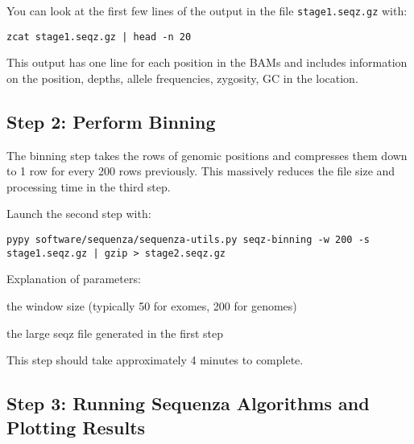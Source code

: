 \begin{information}
You can look at the first few lines of the output in the file \texttt{stage1.seqz.gz} with:
 
\begin{lstlisting}
zcat stage1.seqz.gz | head -n 20
\end{lstlisting}
\end{information}

This output has one line for each position in the BAMs and includes information on the position, depths, allele frequencies, zygosity, GC in the location. 


\subsection{Step 2: Perform Binning}

The binning step takes the rows of genomic positions and compresses them down to 1 row for every 200 rows previously. This massively reduces the file size and processing time in the third step.\\

\begin{steps}
Launch the second step with:
\begin{lstlisting}
pypy software/sequenza/sequenza-utils.py seqz-binning -w 200 -s stage1.seqz.gz | gzip > stage2.seqz.gz
\end{lstlisting}
\end{steps}

\begin{note}
Explanation of parameters:
\begin{description}[style=multiline,labelindent=0cm,align=right,leftmargin=\descriptionlabelspace,rightmargin=1.5cm,font=\ttfamily]
 \item[-w] the window size (typically 50 for exomes, 200 for genomes)
 \item[-s] the large seqz file generated in the first step
\end{description}
\end{note}

This step should take approximately 4 minutes to complete.


\subsection{Step 3: Running Sequenza Algorithms and Plotting Results}

